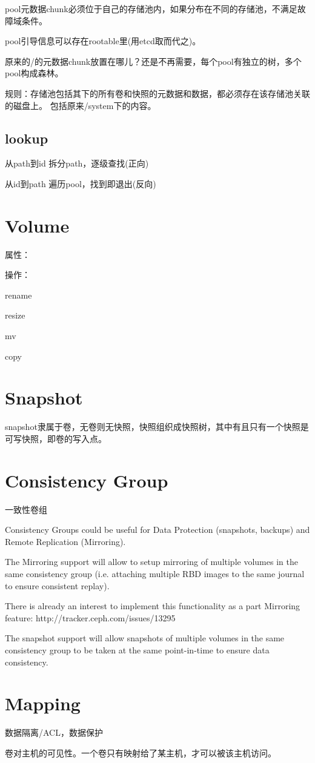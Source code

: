 pool元数据chunk必须位于自己的存储池内，如果分布在不同的存储池，不满足故障域条件。

pool引导信息可以存在rootable里(用etcd取而代之)。

原来的/的元数据chunk放置在哪儿？还是不再需要，每个pool有独立的树，多个pool构成森林。

规则：存储池包括其下的所有卷和快照的元数据和数据，都必须存在该存储池关联的磁盘上。
包括原来/system下的内容。

\subsection{lookup}

\begin{compactitem}
\item 从path到id 拆分path，逐级查找(正向)
\item 从id到path 遍历pool，找到即退出(反向)
\end{compactitem}

\section{Volume}

属性：

操作：
\begin{compactenum}
\item rename
\item resize 
\item mv
\item copy   %
\end{compactenum}

\section{Snapshot}

snapshot隶属于卷，无卷则无快照，快照组织成快照树，其中有且只有一个快照是可写快照，即卷的写入点。

\section{Consistency Group}

一致性卷组 

\begin{shadequote}
Consistency Groups could be useful for Data Protection (snapshots, backups) and
Remote Replication (Mirroring).

The Mirroring support will allow to setup mirroring of multiple volumes in the
same consistency group (i.e. attaching multiple RBD images to the same journal
to ensure consistent replay).

There is already an interest to implement this functionality as a part Mirroring feature:
http://tracker.ceph.com/issues/13295

The snapshot support will allow snapshots of multiple volumes in the same
consistency group to be taken at the same point-in-time to ensure data
consistency.
\end{shadequote}

\section{Mapping}

数据隔离/ACL，数据保护

卷对主机的可见性。一个卷只有映射给了某主机，才可以被该主机访问。

